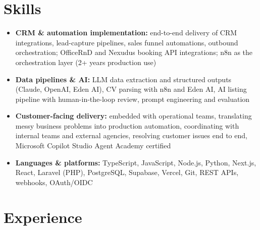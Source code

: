 \documentclass[a4paper,10pt]{article}
\begin{document}
\section{Skills}
\begin{itemize}
 \item \textbf{CRM \& automation implementation:} end-to-end delivery of CRM integrations, lead-capture pipelines, sales funnel automations, outbound orchestration; OfficeRnD and Nexudus booking API integrations; n8n as the orchestration layer (2+ years production use)
 \item \textbf{Data pipelines \& AI:} LLM data extraction and structured outputs (Claude, OpenAI, Eden AI), CV parsing with n8n and Eden AI, AI listing pipeline with human-in-the-loop review, prompt engineering and evaluation
 \item \textbf{Customer-facing delivery:} embedded with operational teams, translating messy business problems into production automation, coordinating with internal teams and external agencies, resolving customer issues end to end, Microsoft Copilot Studio Agent Academy certified
 \item \textbf{Languages \& platforms:} TypeScript, JavaScript, Node.js, Python, Next.js, React, Laravel (PHP), PostgreSQL, Supabase, Vercel, Git, REST APIs, webhooks, OAuth/OIDC
\end{itemize}

\section{Experience}
\end{document}
